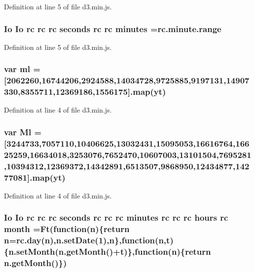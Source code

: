 Definition at line 5 of file d3.\+min.\+js.

\subsubsection[{minutes}]{ {\bf Io} {\bf Io} {\bf rc} {\bf rc} {\bf rc} {\bf seconds} {\bf rc} {\bf rc} minutes ={\bf rc.\+minute.\+range}}\label{d3_8min_8js_a72598fdb591b79002dbda161c75bb151}


Definition at line 5 of file d3.\+min.\+js.

\subsubsection[{ml}]{\setlength{\rightskip}{0pt plus 5cm}var ml =[2062260,16744206,2924588,14034728,9725885,9197131,14907330,8355711,12369186,1556175].{\bf map}(yt)}\label{d3_8min_8js_a0d9f0e68336bd9de8c685c23034eab10}


Definition at line 4 of file d3.\+min.\+js.

\subsubsection[{Ml}]{\setlength{\rightskip}{0pt plus 5cm}var Ml =[3244733,7057110,10406625,13032431,15095053,16616764,16625259,16634018,3253076,7652470,10607003,13101504,7695281,10394312,12369372,14342891,6513507,9868950,12434877,14277081].{\bf map}(yt)}\label{d3_8min_8js_a88efaf87270369546c7abe19df4e8b6f}


Definition at line 4 of file d3.\+min.\+js.

\subsubsection[{month}]{ {\bf Io} {\bf Io} {\bf rc} {\bf rc} {\bf rc} {\bf seconds} {\bf rc} {\bf rc} {\bf rc} {\bf minutes} {\bf rc} {\bf rc} {\bf rc} {\bf hours} {\bf rc} month =Ft(function({\bf n})\{{\bf return} {\bf n}={\bf rc.\+day}({\bf n}),n.\+set\+Date(1),{\bf n}\},function({\bf n},t)\{n.\+set\+Month(n.\+get\+Month()+t)\},function({\bf n})\{{\bf return} n.\+get\+Month()\})}\label{d3_8min_8js_a2d6556be09f71aefa838cf3f524f6485}


